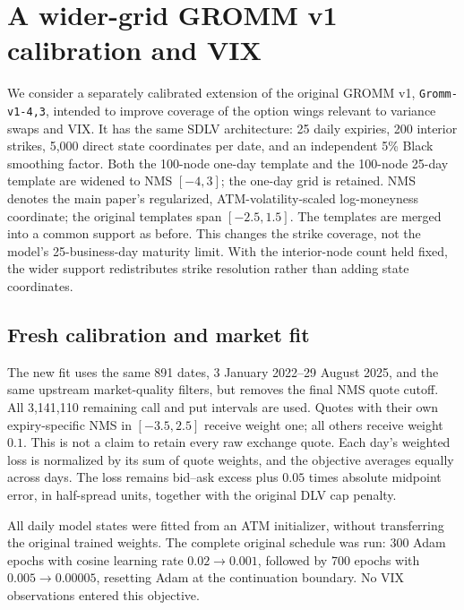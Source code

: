 \section{A wider-grid GROMM v1 calibration and VIX}
\label{sec:wide-grid}


We consider a separately calibrated extension of the original GROMM v1,
\texttt{Gromm-v1-4,3}, intended
to improve coverage of the option wings relevant to variance swaps and VIX.
It has the same SDLV architecture: 25 daily expiries, 200 interior strikes,
5,000 direct state coordinates per date, and an independent 5\% Black
smoothing factor. Both the 100-node one-day template and the 100-node
25-day template are widened to NMS $[-4,3]$; the one-day grid is retained.
NMS denotes the main paper's regularized, ATM-volatility-scaled
log-moneyness coordinate; the original templates span $[-2.5,1.5]$.
The templates are merged into a common support as before. This changes the
strike coverage, not the model's 25-business-day maturity limit.
With the interior-node count held fixed, the wider support redistributes
strike resolution rather than adding state coordinates.

\subsection{Fresh calibration and market fit}

The new fit uses the same 891 dates, 3 January 2022--29 August 2025, and the
same upstream market-quality filters, but removes the final NMS quote cutoff.
All 3,141,110 remaining call and put intervals are used. Quotes with their
own expiry-specific NMS in $[-3.5,2.5]$ receive weight one; all others receive
weight $0.1$. This is not a claim to retain every raw exchange quote. Each
day's weighted loss is normalized by its sum of quote weights, and the
objective averages equally across days. The loss remains bid--ask excess
plus $0.05$ times absolute midpoint error, in half-spread units, together
with the original DLV cap penalty.

All daily model states were fitted from an ATM initializer, without
transferring the original trained weights. The complete original schedule
was run: 300 Adam epochs with cosine learning rate $0.02\to0.001$, followed
by 700 epochs with $0.005\to0.00005$, resetting Adam at the continuation
boundary. No VIX observations entered this objective.



